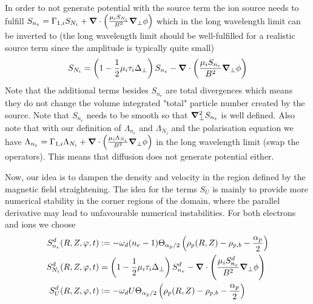 In order to not generate potential with the source term the
ion source needs to fulfill $S_{n_e} = \Gamma_{1,i}S_{N_i} + {\boldsymbol{\nabla}}\cdot\left( \frac{\mu_i S_{N_i}}{B^2}{\boldsymbol{\nabla}}_{\perp} \phi\right)$ which in the long wavelength limit can be inverted to (the long wavelength limit should be well-fulfilled for a realistic source term since the amplitude is typically quite small)
\begin{align}
    S_{N_i} = \left(1-\frac{1}{2}\mu_i \tau_i \Delta_\perp\right) S_{n_e} -{\boldsymbol{\nabla}}\cdot\left( \frac{\mu_i S_{n_e}}{B^2}{\boldsymbol{\nabla}}_{\perp} \phi\right)
  \label{eq:ion_source}
\end{align}
Note that the additional terms besides $S_{n_e}$ are total divergences which means
they do not change the volume integrated "total" particle number created by the source.
Note that $S_{n_e}$ needs to be smooth
so that ${\boldsymbol{\nabla}}_{\perp}^2 S_{n_e}$ is well defined.
Also note that with our definition of $\Lambda_{n_e}$ and $\Lambda_{N_i}$ and
the polarisation equation we have $\Lambda_{n_e} = \Gamma_{1,i}\Lambda_{N_i} + {\boldsymbol{\nabla}}\cdot\left( \frac{\mu_i \Lambda_{N_i}}{B^2}{\boldsymbol{\nabla}}_{\perp} \phi\right)$ in the long wavelength limit (swap the operators).
This means that diffusion does not generate potential either.

Now, our idea is to dampen the density and velocity in the region defined by the
magnetic field straightening.
The idea for the terms $S_U$ is mainly to provide more numerical stability
in the corner regions of the domain, where the parallel derivative may lead
to unfavourable numerical instabilities.
For both electrons and ions we choose
\begin{subequations} \label{eq:velocity_source}
\begin{align}
    S^d_{n_e}(R,Z,\varphi,t) &:= -\omega_d (n_e-1)\Theta_{\alpha_p/2}\left(\rho_p(R,Z) - \rho_{p,b} - \frac{\alpha_p}{2}\right)\\
    S^d_{N_i}(R,Z,\varphi,t) &= \left(1-\frac{1}{2}\mu_i \tau_i \Delta_\perp\right) S^d_{n_e} -{\boldsymbol{\nabla}}\cdot\left( \frac{\mu_i S^d_{n_e}}{B^2}{\boldsymbol{\nabla}}_{\perp} \phi\right)\\
S^d_U(R,Z,\varphi, t)& := -\omega_d U \Theta_{\alpha_p/2}\left(  \rho_p(R,Z) - \rho_{p,b} - \frac{\alpha_p}{2} \right)
\end{align}
\end{subequations}

